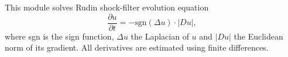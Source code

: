 This module solves Rudin shock-filter evolution equation
$$\frac{\partial u}{\partial t} = - \mathrm{sgn}(\Delta u) \cdot
|Du|,$$
where sgn is the sign function, $\Delta u$ the Laplacian of $u$ and
$|Du|$ the Euclidean norm of its gradient.
All derivatives are estimated using finite differences.
